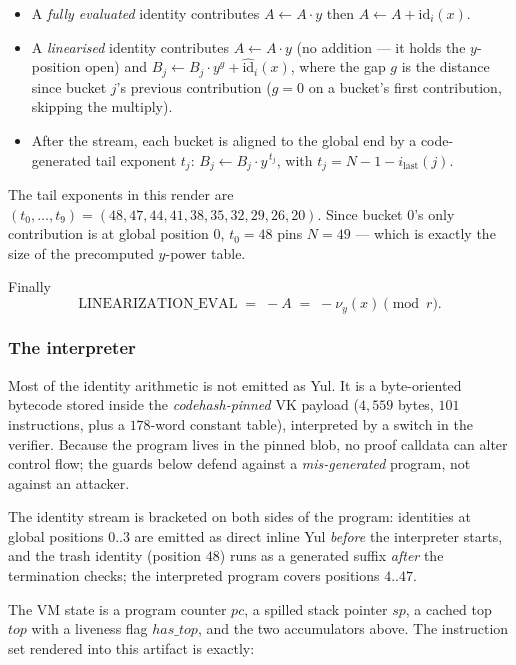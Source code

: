 \documentclass[11pt,a4paper]{article}
\theoremstyle{definition}
\begin{document}
\begin{itemize}[leftmargin=1cm]
\item A \emph{fully evaluated} identity contributes
      $A \leftarrow A\cdot y$ then $A \leftarrow A + \mathrm{id}_i(x)$.
\item A \emph{linearised} identity contributes
      $A \leftarrow A\cdot y$ (no addition --- it holds the $y$-position open)
      and $B_j \leftarrow B_j\cdot y^{g} + \widehat{\mathrm{id}}_i(x)$, where
      the gap $g$ is the distance since bucket $j$'s previous contribution
      ($g = 0$ on a bucket's first contribution, skipping the multiply).
\item After the stream, each bucket is aligned to the global end by a
      code-generated tail exponent $t_j$:
      $B_j \leftarrow B_j \cdot y^{\,t_j}$, with
      $t_j = N-1-i_{\mathrm{last}}(j)$.
\end{itemize}
The tail exponents in this render are
$(t_0,\dots,t_9) = (48,47,44,41,38,35,32,29,26,20)$. Since bucket $0$'s only
contribution is at global position $0$, $t_0 = 48$ pins $N = 49$ --- which is
exactly the size of the precomputed $y$-power table.

Finally
\begin{equation}
\mathrm{LINEARIZATION\_EVAL} \;=\; -A \;=\; -\nu_y(x) \pmod r .
\end{equation}

\subsubsection{The interpreter}

Most of the identity arithmetic is not emitted as Yul. It is a byte-oriented
bytecode stored inside the \emph{codehash-pinned} VK payload
($4{,}559$ bytes, $101$ instructions, plus a $178$-word constant table),
interpreted by a switch in the verifier. Because the program lives in the
pinned blob, no proof calldata can alter control flow; the guards below defend
against a \emph{mis-generated} program, not against an attacker.

The identity stream is bracketed on both sides of the program: identities at
global positions $0..3$ are emitted as direct inline Yul \emph{before} the
interpreter starts, and the trash identity (position $48$) runs as a generated
suffix \emph{after} the termination checks; the interpreted program covers
positions $4..47$.

The VM state is a program counter $\mathit{pc}$, a spilled stack pointer
$\mathit{sp}$, a cached top $\mathit{top}$ with a liveness flag
$\mathit{has\_top}$, and the two accumulators above. The instruction set
rendered into this artifact is exactly:
\end{document}
